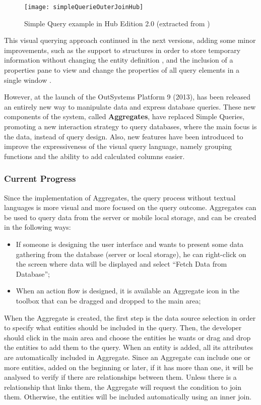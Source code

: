 \begin{figure}[htbp]
	\centering
	\texttt{[image: simpleQuerieOuterJoinHub]}
	\caption{Simple Query example in Hub Edition 2.0 (extracted from \cite{whatsNewHub2})}
	\label{fig:ss_simpleQuerieOuterJoinHub2}
\end{figure}

This visual querying approach continued in the next versions, adding some minor improvements, such as the support to structures in order to store temporary information without changing the entity definition \cite{whatsNewHub22}, and the inclusion of a properties pane to view and change the properties of all query elements in a single window \cite{agilePlatform5}.

However, at the launch of the OutSystems Platform 9 (2013), has been released an entirely new way to manipulate data and express database queries. These new components of the system, called \textbf{Aggregates}, have replaced Simple Queries, promoting a new interaction strategy to query databases, where the main focus is the data, instead of query design. Also, new features have been introduced to improve the expressiveness of the visual query language, namely grouping functions and the ability to add calculated columns easier.


\subsubsection{Current Progress}
\label{subsubsec:current_progress}

Since the implementation of Aggregates, the query process without textual languages is more visual and more focused on the query outcome. Aggregates can be used to query data from the server or mobile local storage, and can be created in the following ways:

\begin{itemize}
	\item If someone is designing the user interface and wants to present some data gathering from the database (server or local storage), he can right-click on the screen where data will be displayed and select “Fetch Data from Database”;
	\item When an action flow is designed, it is available an Aggregate icon in the toolbox that can be dragged and dropped to the main area;
\end{itemize}

When the Aggregate is created, the first step is the data source selection in order to specify what entities should be included in the query. Then, the developer should click in the main area and choose the entities he wants or drag and drop the entities to add them to the query. When an entity is added, all its attributes are automatically included in Aggregate. Since an Aggregate can include one or more entities, added on the beginning or later, if it has more than one, it will be analysed to verify if there are relationships between them. Unless there is a relationship that links them, the Aggregate will request the condition to join them. Otherwise, the entities will be included automatically using an inner join.


